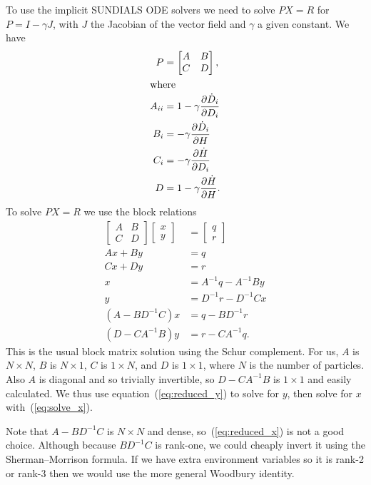 \documentclass{article}
\begin{document}
\newpage

To use the implicit SUNDIALS ODE solvers we need to solve $P X = R$
for $P = I - \gamma J$, with $J$ the Jacobian of the vector field and
$\gamma$ a given constant. We have
\begin{align}
  P &= \begin{bmatrix} A & B \\ C & D \end{bmatrix}, \\
\intertext{where}
  A_{ii} &= 1 - \gamma \frac{\partial \dot{D}_i}{\partial D_i} \\
  B_i &= - \gamma \frac{\partial \dot{D}_i}{\partial H} \\
  C_i &= - \gamma \frac{\partial \dot{H}}{\partial D_i} \\
  D &= 1 - \gamma \frac{\partial \dot{H}}{\partial H}.
\end{align}
To solve $P X = R$ we use the block relations
\begin{align}
  \begin{bmatrix} A & B \\ C & D \end{bmatrix}
  \begin{bmatrix} x \\ y \end{bmatrix}
  &=
  \begin{bmatrix} q \\ r \end{bmatrix} \\
  A x + B y &= q \\
  C x + D y &= r \\
  x &= A^{-1} q - A^{-1} B y \label{eq:solve_x} \\
  y &= D^{-1} r - D^{-1} C x \label{eq:solve_y} \\
  (A - B D^{-1} C) x &= q - B D^{-1} r \label{eq:reduced_x} \\
  (D - C A^{-1} B) y &= r - C A^{-1} q. \label{eq:reduced_y}
\end{align}
This is the usual block matrix solution using the Schur
complement. For us, $A$ is $N \times N$, $B$ is $N \times 1$, $C$ is
$1 \times N$, and $D$ is $1 \times 1$, where $N$ is the number of
particles. Also $A$ is diagonal and so trivially invertible, so $D - C
A^{-1} B$ is $1 \times 1$ and easily calculated. We thus use
equation~(\ref{eq:reduced_y}) to solve for $y$, then solve for $x$
with~(\ref{eq:solve_x}).

Note that $A - B D^{-1} C$ is $N \times N$ and dense,
so~(\ref{eq:reduced_x}) is not a good choice. Although because $B
D^{-1} C$ is rank-one, we could cheaply invert it using the
Sherman–Morrison formula. If we have extra environment variables so it
is rank-2 or rank-3 then we would use the more general Woodbury
identity.
\end{document}
